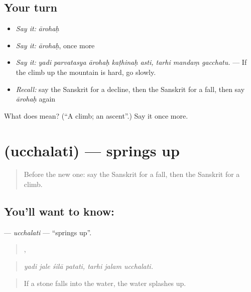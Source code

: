 \subsection*{Your turn}
\begin{itemize}
\raggedright
  \item \emph{Say it:} \emph{ārohaḥ}
  \item \emph{Say it:} \emph{ārohaḥ}, once more
  \item \emph{Say it:} \emph{yadi parvatasya ārohaḥ kaṭhinaḥ asti, tarhi mandaṃ gacchatu.} — If the climb up the mountain is hard, go slowly.
  \item \emph{Recall:} say the Sanskrit for a decline, then the Sanskrit for a fall, then say \emph{ārohaḥ} again
\end{itemize}

\begin{tcolorbox}[breakable,colback=teal!4,colframe=teal!35!black,title={Before you move on}]
What does  mean? (\textquotedblleft{}A climb; an ascent\textquotedblright{}.) Say it once more.
\end{tcolorbox}
\section[\texorpdfstring{\sk{उच्छलति} (ucchalati)}{उच्छलति (ucchalati)}]{ (ucchalati) — springs up}

\label{lesson:SA-C547-ucchalati}



\begin{quote}
Before the new one: say the Sanskrit for a fall, then the Sanskrit for a climb.
\end{quote}

\subsection*{You'll want to know: }
\textbf{} — \emph{ucchalati} — \textquotedblleft{}springs up\textquotedblright{}.

\begin{quote}
   ,   
\end{quote}

\begin{quote}
\emph{yadi jale śilā patati, tarhi jalam ucchalati.}
\end{quote}

\begin{quote}
If a stone falls into the water, the water splashes up.
\end{quote}

